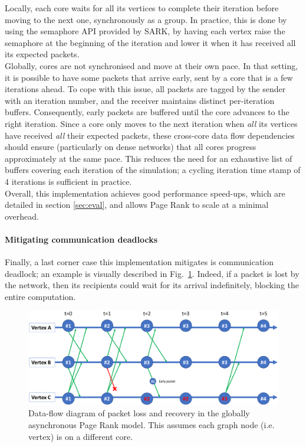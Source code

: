 Locally, each core waits for all its vertices to complete their iteration before moving to the next one, synchronously as a group. In practice, this is done by using the semaphore API provided by SARK, by having each vertex raise the semaphore at the beginning of the iteration and lower it when it has received all its expected packets. \\
 
Globally, cores are not synchronised and move at their own pace. In that setting, it is possible to have some packets that arrive early, sent by a core that is a few iterations ahead. To cope with this issue, all packets are tagged by the sender with an iteration number, and the receiver maintains distinct per-iteration buffers. Consequently, early packets are buffered until the core advances to the right iteration. Since a core only moves to the next iteration when \textit{all} its vertices have received \textit{all} their expected packets, these cross-core data flow dependencies should ensure (particularly on dense networks) that all cores progress approximately at the same pace. This reduces the need for an exhaustive list of buffers covering each iteration of the simulation; a cycling iteration time stamp of 4 iterations is sufficient in practice. \\

Overall, this implementation achieves good performance speed-ups, which are detailed in section \ref{sec:eval}, and allows Page Rank to scale at a minimal overhead.

\paragraph{Mitigating communication deadlocks}

Finally, a last corner case this implementation mitigates is communication deadlock; an example is visually described in Fig.~\ref{fig:pkt}. Indeed, if a packet is lost by the network, then its recipients could wait for its arrival indefinitely, blocking the entire computation. 

\begin{figure}[hbtp]
\centering 
\includegraphics[width=1\hsize]{figures/packet_drop.png}
\caption{Data-flow diagram of packet loss and recovery in the globally asynchronous Page Rank model. This assumes each graph node (i.e. vertex) is on a different core.}
\label{fig:pkt}
\end{figure}

